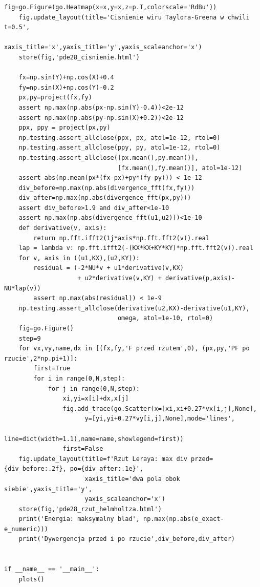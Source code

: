 \begin{lstlisting}[style=pythonpde,caption={Wir Taylora--Greena i rzut Leraya (Plotly)},label={code:pde28-plotly}]
    fig=go.Figure(go.Heatmap(x=x,y=x,z=p.T,colorscale='RdBu'))
    fig.update_layout(title='Cisnienie wiru Taylora-Greena w chwili t=0.5',
                      xaxis_title='x',yaxis_title='y',yaxis_scaleanchor='x')
    store(fig,'pde28_cisnienie.html')

    fx=np.sin(Y)+np.cos(X)+0.4
    fy=np.sin(X)+np.cos(Y)-0.2
    px,py=project(fx,fy)
    assert np.max(np.abs(px-np.sin(Y)-0.4))<2e-12
    assert np.max(np.abs(py-np.sin(X)+0.2))<2e-12
    ppx, ppy = project(px,py)
    np.testing.assert_allclose(ppx, px, atol=1e-12, rtol=0)
    np.testing.assert_allclose(ppy, py, atol=1e-12, rtol=0)
    np.testing.assert_allclose([px.mean(),py.mean()],
                               [fx.mean(),fy.mean()], atol=1e-12)
    assert abs(np.mean(px*(fx-px)+py*(fy-py))) < 1e-12
    div_before=np.max(np.abs(divergence_fft(fx,fy)))
    div_after=np.max(np.abs(divergence_fft(px,py)))
    assert div_before>1.9 and div_after<1e-10
    assert np.max(np.abs(divergence_fft(u1,u2)))<1e-10
    def derivative(v, axis):
        return np.fft.ifft2(1j*axis*np.fft.fft2(v)).real
    lap = lambda v: np.fft.ifft2(-(KX*KX+KY*KY)*np.fft.fft2(v)).real
    for v, axis in ((u1,KX),(u2,KY)):
        residual = (-2*NU*v + u1*derivative(v,KX)
                    + u2*derivative(v,KY) + derivative(p,axis)-NU*lap(v))
        assert np.max(abs(residual)) < 1e-9
    np.testing.assert_allclose(derivative(u2,KX)-derivative(u1,KY),
                               omega, atol=1e-10, rtol=0)
    fig=go.Figure()
    step=9
    for vx,vy,name,dx in [(fx,fy,'F przed rzutem',0), (px,py,'PF po rzucie',2*np.pi+1)]:
        first=True
        for i in range(0,N,step):
            for j in range(0,N,step):
                xi,yi=x[i]+dx,x[j]
                fig.add_trace(go.Scatter(x=[xi,xi+0.27*vx[i,j],None],
                      y=[yi,yi+0.27*vy[i,j],None],mode='lines',
                      line=dict(width=1.1),name=name,showlegend=first))
                first=False
    fig.update_layout(title=f'Rzut Leraya: max div przed={div_before:.2f}, po={div_after:.1e}',
                      xaxis_title='dwa pola obok siebie',yaxis_title='y',
                      yaxis_scaleanchor='x')
    store(fig,'pde28_rzut_helmholtza.html')
    print('Energia: maksymalny blad', np.max(np.abs(e_exact-e_numeric)))
    print('Dywergencja przed i po rzucie',div_before,div_after)


if __name__ == '__main__':
    plots()
\end{lstlisting}



